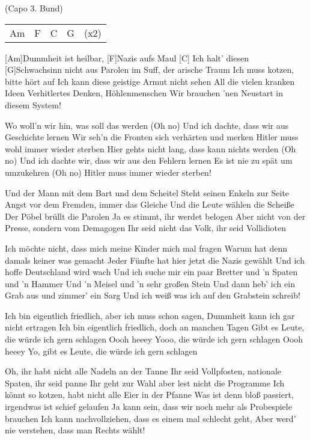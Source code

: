 
(Capo 3. Bund)

\begin{guitar}
	{\footnotesize\begin{tabular}{l|l|l|l l}
			Am & F & C & G & (x2)
	\end{tabular}}
	
	[Am]Dummheit ist heilbar, [F]Nazis aufs Maul
	[C] Ich halt' diesen [G]Schwachsinn nicht aus
	Parolen im Suff, der arische Traum
	Ich muss kotzen, bitte hört auf
	Ich kann diese geistige Armut nicht sehen
	All die vielen kranken Ideen
	Verhitlertes Denken, Höhlenmenschen
	Wir brauchen 'nen Neustart in diesem System!
	
	Wo woll'n wir hin, was soll das werden (Oh no)
	Und ich dachte, dass wir aus Geschichte lernen
	Wir seh'n die Fronten sich verhärten und merken
	Hitler muss wohl immer wieder sterben
	Hier gehts nicht lang, dass kann nichts werden (Oh no)
	Und ich dachte wir, dass wir aus den Fehlern lernen
	Es ist nie zu spät um umzukehren (Oh no)
	Hitler muss immer wieder sterben!
	
	Und der Mann mit dem Bart und dem Scheitel
	Steht seinen Enkeln zur Seite
	Angst vor dem Fremden, immer das Gleiche
	Und die Leute wählen die Scheiße
	Der Pöbel brüllt die Parolen
	Ja es stimmt, ihr werdet belogen
	Aber nicht von der Presse, sondern vom Demagogen
	Ihr seid nicht das Volk, ihr seid Vollidioten

	\pagebreak
	Ich möchte nicht, dass mich meine Kinder mich mal fragen
	Warum hat denn damals keiner was gemacht
	Jeder Fünfte hat hier jetzt die Nazis gewählt
	Und ich hoffe Deutschland wird wach
	Und ich suche mir ein paar Bretter und 'n Spaten und 'n Hammer
	Und 'n Meisel und 'n sehr großen Stein
	Und dann heb' ich ein Grab aus und zimmer' ein Sarg
	Und ich weiß was ich auf den Grabstein schreib!
	
	 
	
	Ich bin eigentlich friedlich, aber ich muss schon sagen,
	Dummheit kann ich gar nicht ertragen
	Ich bin eigentlich friedlich, doch an manchen Tagen
	Gibt es Leute, die würde ich gern schlagen
	Oooh heeey
	Yooo, die würde ich gern schlagen
	Oooh heeey 
	Yo, gibt es Leute, die würde ich gern schlagen
	
	Oh, ihr habt nicht alle Nadeln an der Tanne
	Ihr seid Vollpfosten, nationale Spaten, ihr seid panne
	Ihr geht zur Wahl aber lest nicht die Programme
	Ich könnt so kotzen, habt nicht alle Eier in der Pfanne
	Was ist denn bloß passiert, irgendwas ist schief gelaufen
	Ja kann sein, dass wir noch mehr als Probespiele brauchen
	Ich kann nachvollziehen, dass es einem mal schlecht geht, 
	Aber werd' nie verstehen, dass man Rechts wählt!
	
	 
\end{guitar}